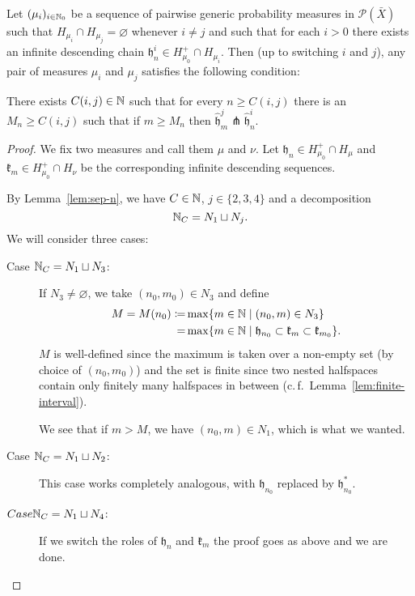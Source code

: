 \begin{lemma}[{\cite[Lemma~4.13]{MR3509968}}]
  \label{lem:4.13}
  Let \((\mu_i)_{i \in \mathbb{N}_0}\) be a sequence of pairwise generic probability measures in \(\mathcal{P}(\bar X)\) such that \(H_{\mu_i} \cap H_{\mu_j} = \varnothing\) whenever \(i \neq j\) and such that for each \(i > 0\) there exists an infinite descending chain \(\mathfrak{h}_n^i \in H_{\mu_0}^+ \cap H_{\mu_i}\). Then (up to switching \(i\) and \(j\)), any pair of measures \(\mu_i\) and \(\mu_j\) satisfies the following condition:

  There exists \(C(i,j) \in \mathbb{N}\) such that for every \(n \geq C(i,j)\) there is an \(M_n \geq C(i,j)\) such that if \(m \geq M_n\) then \(\mathfrak{\hat h}^j_m \pitchfork \mathfrak{\hat h}^i_n\). 
\end{lemma}

\begin{proof}
  We fix two measures and call them \(\mu\) and \(\nu\). Let \(\mathfrak{h}_n \in H_{\mu_0}^+ \cap H_\mu\) and \(\mathfrak{k}_m \in H_{\mu_0}^+ \cap H_\nu\) be the corresponding infinite descending sequences.
  
  By Lemma~\ref{lem:sep-n}, we have \(C \in \mathbb{N}\), \(j \in \{2,3,4\}\) and a decomposition
  \[
    \mathbb{N}_C = N_1 \sqcup N_j.
  \]
  We will consider three cases:
  \begin{description}
  \item[Case \(\mathbb{N}_C = N_1 \sqcup N_3\):] If \(N_3 \neq \varnothing\), we take \((n_0, m_0) \in N_3\) and define
    \begin{align*}
      M = M(n_0)  \coloneqq & \max \{m \in \mathbb{N} \mid (n_0, m) \in N_3\}\\
                      = & \max \{m \in \mathbb{N} \mid \mathfrak{h}_{n_0} \subset \mathfrak{k}_m \subset \mathfrak{k}_{m_0}\}.
    \end{align*}
    \(M\) is well-defined since the maximum is taken over a non-empty set (by choice of \((n_0, m_0)\)) and the set is finite since two nested halfspaces contain only finitely many halfspaces in between (c.\,f.\ Lemma~\ref{lem:finite-interval}).

    We see that if \(m > M\), we have \((n_0, m) \in N_1\), which is what we wanted.
  \item[Case \(\mathbb{N}_C = N_1 \sqcup N_2\):] This case works completely analogous, with \(\mathfrak{h}_{n_0}\) replaced by \(\mathfrak{h}_{n_0}^\ast\).
  \item[\(Case \mathbb{N}_C = N_1 \sqcup N_4\):] If we switch the roles of \(\mathfrak{h}_n\) and \(\mathfrak{k}_m\) the proof goes as above and we are done.
  \end{description}
\end{proof}

